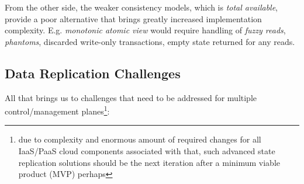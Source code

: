 \documentclass[conference]{IEEEtran}
\begin{document}
From the other side, the weaker consistency models, which is \textit{total
available}\cite{b4}, provide a poor alternative that brings greatly increased
implementation complexity. E.g. \textit{monotonic atomic view}\cite{b4} would
require handling of \textit{fuzzy reads}\cite{b4}, \textit{phantoms}\cite{b4},
discarded write-only transactions, empty state returned for any reads.

\subsection{Data Replication Challenges}

All that brings us to challenges that need to be addressed for multiple
control/management planes\footnote{due to complexity and enormous amount of
required changes for all IaaS/PaaS cloud components associated with that, such
advanced state replication solutions should be the next iteration after a
minimum viable product (MVP) perhaps}:
\end{document}
